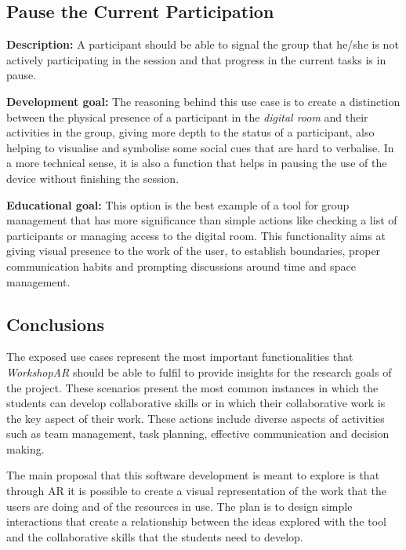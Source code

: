 \subsection{Pause the Current Participation \label{sec:4-2-9}}

\textbf{Description:} A participant should be able to signal the group that he/she is not actively participating in the session and that progress in the current tasks is in pause.

\noindent
\textbf{Development goal:} The reasoning behind this use case is to create a distinction between the physical presence of a participant in the \emph{digital room} and
their activities in the group, giving more depth to the status of a participant, also helping to visualise and symbolise some social cues that are hard to verbalise. In a
more technical sense, it is also a function that helps in pausing the use of the device without finishing the session.

\noindent
\textbf{Educational goal:} This option is the best example of a tool for group management that has more significance than simple actions like checking a list of
participants or managing access to the digital room. This functionality aims at giving visual presence to the work of the user, to establish boundaries, proper
communication habits and prompting discussions around time and space management.

\subsection{Conclusions \label{sec:4-2-10}}

The exposed use cases represent the most important functionalities that \emph{WorkshopAR} should be able to fulfil to provide insights for the research goals of the
project. These scenarios present the most common instances in which the students can develop collaborative skills or in which their collaborative work is the key aspect of
their work. These actions include diverse aspects of activities such as team management, task planning, effective communication and decision making.

The main proposal that this software development is meant to explore is that through \ac{AR} it is possible to create a visual representation of the work that the users
are doing and of the resources in use. The plan is to design simple interactions that create a relationship between the ideas explored with the tool and the collaborative
skills that the students need to develop.

